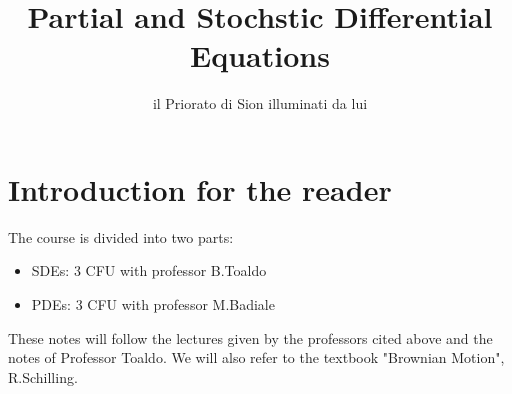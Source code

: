 \documentclass[a4paper, 11pt, openright]{report}
\title{Partial and Stochstic Differential Equations}
\author{il Priorato di Sion illuminati da lui}
\begin{document}
	\maketitle
	\newpage
	\tableofcontents
    \newpage

    \section*{Introduction for the reader}
    The course is divided into two parts:
    \begin{itemize}
        \item SDEs: 3 CFU with professor B.Toaldo
        \item PDEs: 3 CFU with professor M.Badiale
    \end{itemize}
    These notes will follow the lectures given by the professors cited above and the notes of Professor Toaldo. We will also refer to the textbook "Brownian Motion", R.Schilling.\\
     
    
    
    
\end{document}
